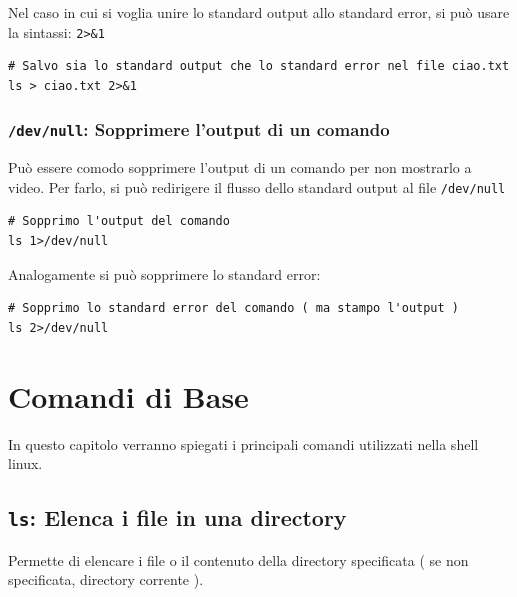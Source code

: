 \documentclass[a4paper]{report}
\newenvironment{info}{\begin{tcolorbox}[fonttitle=\sffamily\bfseries\large,title=Info,colframe=blue!75!white]}{\end{tcolorbox}}
\newenvironment{code}{\begin{tcolorbox}[size=small]}{\end{tcolorbox}}
\begin{document}
\begin{info}
	Nel caso in cui si voglia unire lo standard output allo standard error, si può usare la sintassi: \texttt{2>\&1}
	\begin{lstlisting}
# Salvo sia lo standard output che lo standard error nel file ciao.txt
ls > ciao.txt 2>&1
	\end{lstlisting}
\end{info}

\subsection{\texttt{/dev/null}: Sopprimere l'output di un comando}

Può essere comodo sopprimere l'output di un comando per non mostrarlo a video. Per farlo, si può redirigere il flusso dello standard output al file \texttt{/dev/null}
\begin{code}
\begin{lstlisting}
# Sopprimo l'output del comando
ls 1>/dev/null
\end{lstlisting}
\end{code}

\begin{info}
	Analogamente si può sopprimere lo standard error:
	\begin{lstlisting}
# Sopprimo lo standard error del comando ( ma stampo l'output )
ls 2>/dev/null
	\end{lstlisting}
\end{info}


\chapter{Comandi di Base}

In questo capitolo verranno spiegati i principali comandi utilizzati nella shell linux.

\section{\texttt{ls}: Elenca i file in una directory}
Permette di elencare i file o il contenuto della directory specificata ( se non specificata, directory corrente ).
\end{document}
